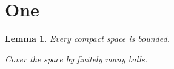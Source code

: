 \documentclass{article}
\newtheorem{lem}{Lemma}
\begin{document}
\section{One}
\begin{lem} Every compact space is bounded.

%
 Cover the space by finitely many balls.
\end{lem}
\end{document}
